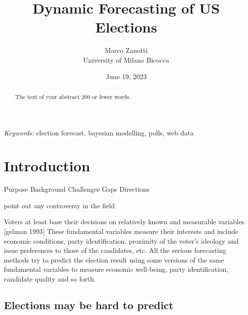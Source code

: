 \documentclass[
  12pt]{article}
\begin{document}
\def\spacingset#1{\renewcommand{\baselinestretch}%
{#1}\small\normalsize} \spacingset{1}



\date{June 19, 2023}
\title{\bf Dynamic Forecasting of US Elections}
\author{
Marco Zanotti\\
University of Milano Bicocca\\
}
\maketitle

\bigskip
\bigskip
\begin{abstract}
The text of your abstract 200 or fewer words.
\end{abstract}

\noindent%
{\it Keywords:} election forecast, bayesian modelling, polls, web data
\vfill

\newpage
\spacingset{1.9} %
\ifdefined\Shaded\renewenvironment{Shaded}{\begin{tcolorbox}[borderline west={3pt}{0pt}{shadecolor}, breakable, sharp corners, interior hidden, enhanced, boxrule=0pt, frame hidden]}{\end{tcolorbox}}\fi

\hypertarget{sec-intro}{%
\section{Introduction}\label{sec-intro}}

\addtolength{\textheight}{.5in}%

Purpose Background Challenges Gaps Directions

point out any controversy in the field

Voters at least base their decisions on relatively known and measurable
variables {[}gelman 1993{]} These fundamental variables measure their
interests and include economic conditions, party identification,
proximity of the voter's ideology and issue preferences to those of the
candidates, etc. All the serious forecasting methods try to predict the
election result using some versions of the same fundamental variables to
measure economic well-being, party identification, candidate quality and
so forth.

\hypertarget{elections-may-be-hard-to-predict}{%
\subsection{Elections may be hard to
predict}\label{elections-may-be-hard-to-predict}}
\end{document}
